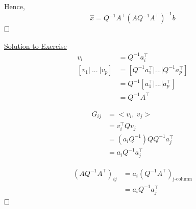 \documentclass[letterpaper]{article}
\begin{document}
Hence, 
$$\hat{x} = Q^{-1}A^\top(AQ^{-1}A^\top)^{-1}b$$ $\hfill \square$

\underline{Solution to Exercise}
$$\begin{aligned} v_i &= Q^{-1} a_i^\top\\
[v_1 | ~... ~|v_p]  &= [Q^{-1}a_1^\top | ... | Q^{-1}a_p^\top]\\
&= Q^{-1}[a_1^\top | ... | a_p^\top]\\
&= Q^{-1} A^\top 
\end{aligned}$$


$$\begin{aligned}
G_{ij} &= <v_i, ~v_j>\\
&= v_i^\top Q v_j\\
&= (a_i Q^{-1})QQ^{-1} a_j^\top\\
&= a_i Q^{-1} a_j^\top
\end{aligned}$$

$$\begin{aligned}(AQ^{-1}A^\top)_{ij} &= a_i (Q^{-1} A^\top)_{\text{j-column}}\\
&= a_i Q^{-1} a_j^\top \end{aligned}$$
$\hfill \square$
\end{document}
